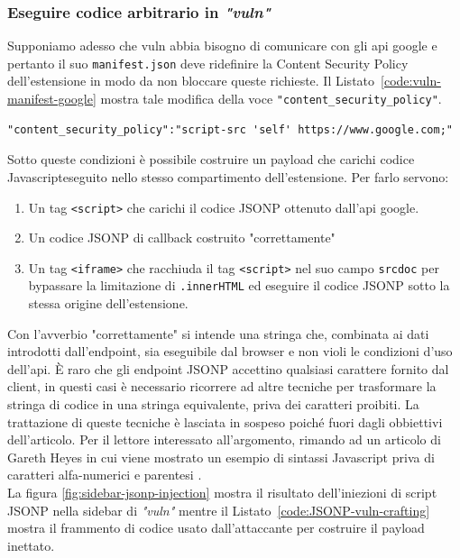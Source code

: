 \documentclass{sapthesis}
\newcommand{\code}[1]{\texttt{#1}}
\newcommand{\attr}[1]{\code{.#1}}
\newcommand{\refCode}[1]{Listato~\ref{#1}}
\newcommand{\vuln}{\textit{"vuln"}}
\newcommand{\JS}{Javascript}
\newcommand{\manifest}{\code{manifest.json}}
\newcommand{\tagHTML}[1]{\code{<#1>}}
\newcommand{\script}{\tagHTML{script}}
\newcommand{\iframe}{\tagHTML{iframe}}
\begin{document}
                \subsubsection{Eseguire codice arbitrario in \vuln}
                Supponiamo adesso che vuln abbia bisogno di comunicare con gli api google e pertanto il
                suo \manifest{} deve ridefinire la Content Security Policy dell'estensione in modo da
                non bloccare queste richieste. Il \refCode{code:vuln-manifest-google} mostra tale
                modifica della voce \code{"content\_security\_policy"}.

                \begin{lstlisting}[label=code:vuln-manifest-google,caption={Voce \code{"content\_security\_policy"} nel \manifest{} di \vuln{}}]
"content_security_policy":"script-src 'self' https://www.google.com;"
                \end{lstlisting}

                Sotto queste condizioni è possibile costruire un payload che carichi
                codice \JS eseguito nello stesso compartimento dell'estensione. 
                Per farlo servono:
                \begin{enumerate}
                    \item Un tag \script{} che carichi il codice JSONP ottenuto dall'api google.
                    \item Un codice JSONP di callback costruito "correttamente"
                    \item Un tag \iframe{} che racchiuda il tag \script{} nel suo campo \code{srcdoc}
                            per bypassare la limitazione di \attr{innerHTML} ed eseguire il codice
                            JSONP sotto la stessa origine dell'estensione.
                \end{enumerate}
                Con l'avverbio "correttamente" si intende una stringa che, combinata ai dati
                introdotti dall'endpoint, sia eseguibile dal browser e non violi le condizioni
                d'uso dell'api. È raro che gli endpoint JSONP accettino qualsiasi carattere 
                fornito dal client, in questi casi è necessario ricorrere ad altre tecniche per
                trasformare la stringa di codice in una stringa equivalente, priva dei caratteri
                proibiti. La trattazione di queste tecniche è lasciata in sospeso poiché fuori dagli
                obbiettivi dell'articolo. Per il lettore interessato all'argomento, rimando ad un
                articolo di Gareth Heyes in cui viene mostrato un esempio di sintassi \JS{} priva di caratteri
                alfa-numerici e parentesi \cite{gareth-heyes-js-no-alphanum}.\\
                La figura \ref{fig:sidebar-jsonp-injection} mostra il risultato dell'iniezioni di
                script JSONP nella sidebar di \vuln{} mentre il \refCode{code:JSONP-vuln-crafting} 
                mostra il frammento di codice usato dall'attaccante per costruire il payload inettato.
                
\end{document}
